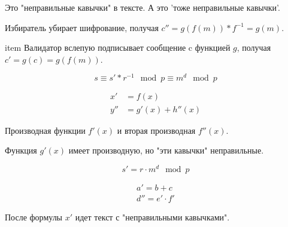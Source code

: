 \documentclass{article}
\begin{document}
Это "неправильные кавычки" в тексте.
А это 'тоже неправильные кавычки'.

\item Избиратель убирает шифрование, получая \(c''=g(f(m))*f^{-1}=g(m)\).

item Валидатор вслепую подписывает сообщение c функцией $g$, получая \(c'=g(c)=g(f(m))\).

\begin{equation}\label{eq:modEx}
s \equiv s' * r^{-1} \mod{p} \equiv m^d \mod{p}
\end{equation}

\begin{align}
x' &= f(x) \\
y'' &= g'(x) + h''(x)
\end{align}

Производная функции $f'(x)$ и вторая производная $f''(x)$.

Функция $g'(x)$ имеет производную, но "эти кавычки" неправильные.

\[
s' = r \cdot m^d \mod p
\]

\begin{gather}
a' = b + c \\
d'' = e' \cdot f'
\end{gather}

После формулы $x'$ идет текст с "неправильными кавычками".
\end{document}
